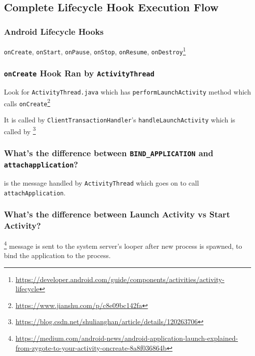 \label{task:20240401_aosp}
 
\subsection{Complete Lifecycle Hook Execution Flow}

\subsubsection{Android Lifecycle Hooks}

\texttt{onCreate}, \texttt{onStart}, \texttt{onPause}, \texttt{onStop}, \texttt{onResume}, \texttt{onDestroy}\footnote{\url{https://developer.android.com/guide/components/activities/activity-lifecycle}}

\subsubsection{\texttt{onCreate} Hook Ran by \texttt{ActivityThread}}

Look for \texttt{ActivityThread.java} which has \texttt{performLaunchActivity} method which calls \texttt{onCreate}\footnote{\url{https://www.jianshu.com/p/c8e09bc142fa}}

It is called by \texttt{ClientTransactionHandler}'s \texttt{handleLaunchActivity} which is called by \footnote{\url{https://blog.csdn.net/shulianghan/article/details/120263706}}

\subsubsection{What's the difference between \texttt{BIND\_APPLICATION} and \texttt{attachapplication}?}

 is the message handled by \texttt{ActivityThread} which goes on to call \texttt{attachApplication}.

\subsubsection{What's the difference between Launch Activity vs Start Activity?}

\footnote{\url{https://medium.com/android-news/android-application-launch-explained-from-zygote-to-your-activity-oncreate-8a8f036864b}} message is sent to the system server's looper after new process is spawned, to bind the application to the process.

